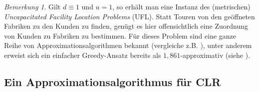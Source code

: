 \documentclass[a4paper,ngerman,11pt,bibtotoc]{scrartcl}
\theoremstyle{definition}
\theoremstyle{plain}
\theoremstyle{remark}
\newtheorem{bem}[defn]{Bemerkung}
\newcommand{\CLR}{CLR}
\newcommand{\UFL}{UFL}
\begin{document}
\begin{bem}
	Gilt $d \equiv 1$ und $u = 1$, so erhält man eine Instanz des (metrischen) \emph{Uncapacitated Facility Location Problems} (\UFL). Statt Touren von den geöffneten Fabriken zu den Kunden zu finden, genügt es hier offensichtlich eine Zuordnung von Kunden zu Fabriken zu bestimmen. Für dieses Problem sind eine ganze Reihe von Approximationsalgorithmen bekannt (vergleiche z.B. \cite{AAfFLP}), unter anderem erweist sich ein einfacher Greedy-Ansatz bereits als $1,861$-approximativ (siehe \cite{GreedyApprox}).
\end{bem}


	\subsection{Ein Approximationsalgorithmus für \CLR}
\end{document}
